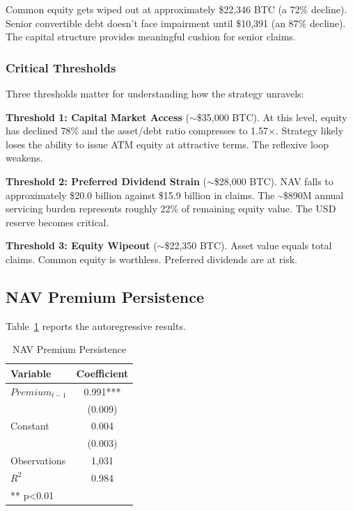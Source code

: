 Common equity gets wiped out at approximately \$22,346 BTC (a 72\% decline). Senior convertible debt doesn't face impairment until \$10,391 (an 87\% decline). The capital structure provides meaningful cushion for senior claims.

\subsubsection{Critical Thresholds}

Three thresholds matter for understanding how the strategy unravels:

\textbf{Threshold 1: Capital Market Access} ($\sim$\$35,000 BTC). At this level, equity has declined 78\% and the asset/debt ratio compresses to 1.57$\times$. Strategy likely loses the ability to issue ATM equity at attractive terms. The reflexive loop weakens.

\textbf{Threshold 2: Preferred Dividend Strain} ($\sim$\$28,000 BTC). NAV falls to approximately \$20.0 billion against \$15.9 billion in claims. The \textasciitilde\$890M annual servicing burden represents roughly 22\% of remaining equity value. The USD reserve becomes critical.

\textbf{Threshold 3: Equity Wipeout} ($\sim$\$22,350 BTC). Asset value equals total claims. Common equity is worthless. Preferred dividends are at risk.

\subsection{NAV Premium Persistence}

Table~\ref{tab:regression} reports the autoregressive results.

\begin{table}[H]
\centering
\caption{NAV Premium Persistence}
\label{tab:regression}
\begin{tabular}{@{}lc@{}}
\toprule
\textbf{Variable} & \textbf{Coefficient} \\
\midrule
$Premium_{t-1}$ & 0.991*** \\
& (0.009) \\
Constant & 0.004 \\
& (0.003) \\
\midrule
Observations & 1,031 \\
$R^2$ & 0.984 \\
\bottomrule
\multicolumn{2}{l}{\footnotesize *** p<0.01}
\end{tabular}
\end{table}

